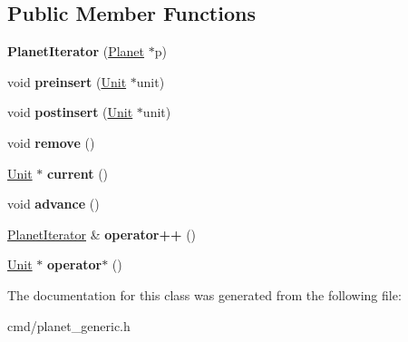 \subsection*{Public Member Functions}
\begin{DoxyCompactItemize}
\item 
{\bfseries Planet\+Iterator} (\hyperlink{classPlanet}{Planet} $\ast$p)\hypertarget{classPlanet_1_1PlanetIterator_a2f80ba67568976ff0d87597a4c8aa9c4}{}\label{classPlanet_1_1PlanetIterator_a2f80ba67568976ff0d87597a4c8aa9c4}

\item 
void {\bfseries preinsert} (\hyperlink{classUnit}{Unit} $\ast$unit)\hypertarget{classPlanet_1_1PlanetIterator_a75c0645ce444588495130492153fd567}{}\label{classPlanet_1_1PlanetIterator_a75c0645ce444588495130492153fd567}

\item 
void {\bfseries postinsert} (\hyperlink{classUnit}{Unit} $\ast$unit)\hypertarget{classPlanet_1_1PlanetIterator_a4561cc0cba7bb58db0947191a5a51310}{}\label{classPlanet_1_1PlanetIterator_a4561cc0cba7bb58db0947191a5a51310}

\item 
void {\bfseries remove} ()\hypertarget{classPlanet_1_1PlanetIterator_a66bd724fb2ca0c83a737a96ebb056b72}{}\label{classPlanet_1_1PlanetIterator_a66bd724fb2ca0c83a737a96ebb056b72}

\item 
\hyperlink{classUnit}{Unit} $\ast$ {\bfseries current} ()\hypertarget{classPlanet_1_1PlanetIterator_a65cc173062896c402697c3b0689cecc2}{}\label{classPlanet_1_1PlanetIterator_a65cc173062896c402697c3b0689cecc2}

\item 
void {\bfseries advance} ()\hypertarget{classPlanet_1_1PlanetIterator_aeb0c1a97d61c07b73d3213cf66f3f06a}{}\label{classPlanet_1_1PlanetIterator_aeb0c1a97d61c07b73d3213cf66f3f06a}

\item 
\hyperlink{classPlanet_1_1PlanetIterator}{Planet\+Iterator} \& {\bfseries operator++} ()\hypertarget{classPlanet_1_1PlanetIterator_a10bc34b34661db16820bdef0ddef021e}{}\label{classPlanet_1_1PlanetIterator_a10bc34b34661db16820bdef0ddef021e}

\item 
\hyperlink{classUnit}{Unit} $\ast$ {\bfseries operator$\ast$} ()\hypertarget{classPlanet_1_1PlanetIterator_adb2ed283ed8741c1c3c4a562410f0cba}{}\label{classPlanet_1_1PlanetIterator_adb2ed283ed8741c1c3c4a562410f0cba}

\end{DoxyCompactItemize}


The documentation for this class was generated from the following file\+:\begin{DoxyCompactItemize}
\item 
cmd/planet\+\_\+generic.\+h\end{DoxyCompactItemize}
